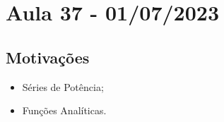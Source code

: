 \documentclass[../analysis_notes.tex]{subfiles}
\begin{document}
\section{Aula 37 - 01/07/2023}
\subsection{Motivações}
\begin{itemize}
	\item Séries de Potência;
	\item Funções Analíticas.
\end{itemize}
\end{document}
